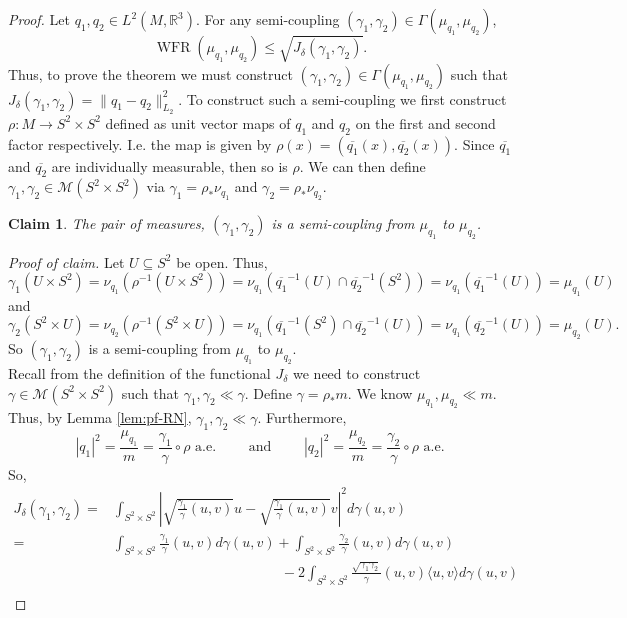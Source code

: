 \documentclass[final,hidelinks,onefignum,onetabnum]{siamart220329}
\newtheorem{claim}{Claim}
\newcommand{\R}{\mathbb{R}}
\newcommand{\WFR}{\operatorname{WFR}}
\begin{document}
\begin{proof}
     Let $q_1,q_2\in L^2(M,\R^3)$. For any semi-coupling $(\gamma_1,\gamma_2)\in\Gamma(\mu_{q_1},\mu_{q_2})$,\[\WFR(\mu_{q_1},\mu_{q_2})\leq \sqrt{J_\delta(\gamma_1,\gamma_2)}.\]
Thus, to prove the theorem we must construct $(\gamma_1,\gamma_2)\in \Gamma(\mu_{q_1},\mu_{q_2})$ such that $J_\delta(\gamma_1,\gamma_2)=\|q_1-q_2\|^2_{L_2}$. To construct such a semi-coupling  we first construct $\rho:M\to S^2\times S^2$ defined as unit vector maps of ${q_1}$ and ${q_2}$ on the first and second factor respectively. I.e. the map is given by $\rho(x)=\left(\overline{q_1}(x),\overline{q_2}(x)\right).$
Since $\overline{q_1}$ and $\overline{q_2}$ are individually measurable, then so is $\rho$. We can then define $\gamma_1,\gamma_2\in\mathcal{M}(S^2\times S^2)$ via $\gamma_1=\rho_*\nu_{q_1}$ and $\gamma_2=\rho_*\nu_{q_2}$. 
\begin{claim}
The pair of measures, $(\gamma_1,\gamma_2)$ is a semi-coupling from $\mu_{q_1}$ to $\mu_{q_2}$.
\end{claim}
\textit{Proof of claim. } Let $U\subseteq S^2$ be open. Thus,
\[\gamma_1(U\times S^2)= \nu_{q_1}\left(\rho^{-1}(U\times S^2)\right)= \nu_{q_1}\left(\overline{{q_1}}^{-1}(U)\cap \overline{q_2}^{-1}(S^2)\right)=\nu_{q_1}\left(\overline{{q_1}}^{-1}(U)\right)=\mu_{q_1}(U) \]and\[\gamma_2(S^2\times U)= \nu_{q_2}\left(\rho^{-1}(S^2\times U)\right)= \nu_{q_1}\left(\overline{{q_1}}^{-1}(S^2)\cap \overline{q_2}^{-1}(U)\right)=\nu_{q_1}\left(\overline{q_2}^{-1}(U)\right)=\mu_{q_2}(U).\]
So $(\gamma_1,\gamma_2)$ is a semi-coupling from $\mu_{q_1}$ to $\mu_{q_2}$.
\bigskip\\
Recall from the definition of the functional $J_\delta$ we need to construct $\gamma\in\mathcal{M}(S^2\times S^2)$ such that $\gamma_1,\gamma_2\ll\gamma$. Define $\gamma= \rho_*m$. We know $\mu_{q_1},\mu_{q_2}\ll m$. Thus, by Lemma \ref{lem:pf-RN}, $\gamma_1,\gamma_2\ll\gamma$. Furthermore,\[|{q_1}|^2=\frac{\mu_{q_1}}{m}=\frac{\gamma_1}{\gamma}\circ \rho\text{ a.e.}\qquad\text{ and }\qquad|q_2|^2=\frac{\mu_{q_2}}{m}=\frac{\gamma_2}{\gamma}\circ \rho \text{ a.e.}\]
So,
\begin{align*}
    J_\delta(\gamma_1,\gamma_2)=&\int_{S^2\times S^2}\left|\sqrt{\frac{\gamma_1}{\gamma}(u,v)}u-\sqrt{\frac{\gamma_1}{\gamma}(u,v)}v\right|^2 d\gamma(u,v)\\
    =&\int_{S^2\times S^2}\frac{\gamma_1}{\gamma}(u,v)d\gamma(u,v)+\int_{S^2\times S^2}\frac{\gamma_2}{\gamma}(u,v)d\gamma(u,v)\\
    &\qquad\qquad\qquad\qquad\qquad\qquad-2\int_{S^2\times S^2}\frac{\sqrt{\gamma_1\gamma_2}}{\gamma}(u,v) \langle u,v\rangle d\gamma(u,v)\\

\end{align*}
\end{proof}
\end{document}
